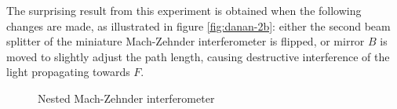 \documentclass{article}
\begin{document}
The surprising result from this experiment is obtained when the following 
changes are made, as illustrated in figure \ref{fig:danan-2b}:
either the second beam splitter of the miniature Mach-Zehnder interferometer is 
flipped, or mirror $B$ is moved to slightly adjust the path length, causing 
destructive interference of the light propagating towards $F$. 

\begin{figure}
	\subfloat[]{\label{fig:danan-2a}}
	\subfloat[]{\label{fig:danan-2b}}
	\newline
	\hspace*{\fill}
	\subfloat[]{\label{fig:danan-2c}}
	\hspace*{\fill}
	\caption{Nested Mach-Zehnder interferometer}
	\label{fig:danan}
\end{figure}
\end{document}
